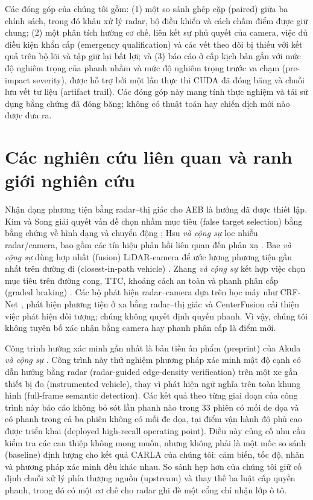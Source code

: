 \documentclass[11pt,a4paper]{article}
\begin{document}
Các đóng góp của chúng tôi gồm: (1) một so sánh ghép cặp (paired) giữa ba chính sách,
trong đó khâu xử lý radar, bộ điều khiển và cách chấm điểm được giữ chung; (2)
một phân tích hướng cơ chế, liên kết sự phủ quyết của camera, việc đủ điều kiện
khẩn cấp (emergency qualification) và các vết theo dõi bị thiếu với kết quả
trên bộ lõi và tập giữ lại bất lợi; và (3) báo cáo ở cấp kịch bản gắn với mức
độ nghiêm trọng của phanh nhầm và mức độ nghiêm trọng trước va chạm (pre-impact
severity), được hỗ trợ bởi một lần thực thi CUDA đã đóng băng và chuỗi lưu vết
tư liệu (artifact trail). Các đóng góp này mang tính thực nghiệm và tái sử dụng
bằng chứng đã đóng băng; không có thuật toán hay chiến dịch mới nào được đưa
ra.

\section{Các nghiên cứu liên quan và ranh giới nghiên cứu}
Nhận dạng phương tiện bằng radar--thị giác cho AEB là hướng đã được thiết lập.
Kim và Song giải quyết vấn đề chọn nhầm mục tiêu (false target selection) bằng
bằng chứng về hình dạng và chuyển động \cite{kim2013vehicle}; Hsu \emph{và
cộng sự} lọc nhiễu radar/camera, bao gồm các tín hiệu phản hồi liên quan đến
phản xạ \cite{hsu2015noise}. Bae \emph{và cộng sự} dùng hợp nhất (fusion)
LiDAR-camera để ước lượng phương tiện gần nhất trên đường đi (closest-in-path
vehicle) \cite{bae2021cipv}. Zhang \emph{và cộng sự} kết hợp việc chọn mục
tiêu trên đường cong, TTC, khoảng cách an toàn và phanh phân cấp (graded
braking) \cite{zhang2023curved}. Các bộ phát hiện radar--camera dựa trên học
máy như CRF-Net \cite{nobis2019crfnet}, phát hiện phương tiện ở xa bằng
radar--thị giác \cite{chadwick2019distant} và CenterFusion
\cite{nabati2021centerfusion} cải thiện việc phát hiện đối tượng; chúng không
quyết định quyền phanh. Vì vậy, chúng tôi không tuyên bố xác nhận bằng camera
hay phanh phân cấp là điểm mới.

Công trình hướng xác minh gần nhất là bản tiền ấn phẩm (preprint) của Akula
\emph{và cộng sự} \cite{akula2026radarguided}. Công trình này thử nghiệm
phương pháp xác minh mật độ cạnh có dẫn hướng bằng radar (radar-guided
edge-density verification) trên một xe gắn thiết bị đo (instrumented vehicle),
thay vì phát hiện ngữ nghĩa trên toàn khung hình (full-frame semantic
detection). Các kết quả theo từng giai đoạn của công trình này báo cáo không
bỏ sót lần phanh nào trong 33 phiên có mối đe dọa và có phanh trong cả ba
phiên không có mối đe dọa, tại điểm vận hành độ phủ cao được triển khai
(deployed high-recall operating point). Điều này củng cố nhu cầu kiểm tra các
can thiệp không mong muốn, nhưng không phải là một mốc so sánh (baseline) định
lượng cho kết quả CARLA của chúng tôi: cảm biến, tốc độ, nhãn và phương pháp
xác minh đều khác nhau. So sánh hẹp hơn của chúng tôi giữ cố định chuỗi xử lý
phía thượng nguồn (upstream) và thay thế ba luật cấp quyền phanh, trong đó có
một cơ chế cho radar ghi đè một cổng chỉ nhận lớp ô tô.
\end{document}
